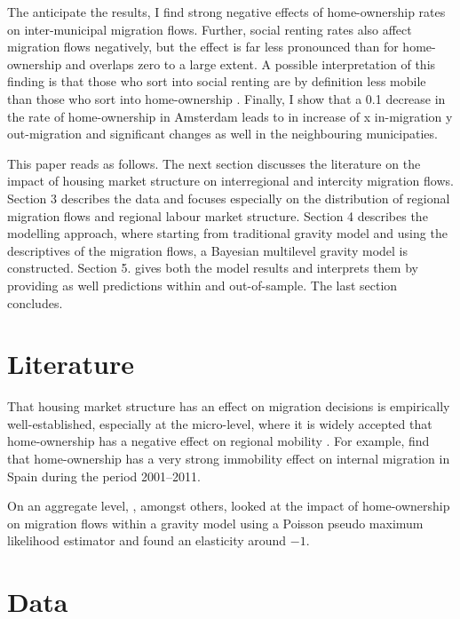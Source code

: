 \documentclass[fleqn,10pt]{SelfArx} %
\begin{document}
		The anticipate the results, I find strong negative effects of home-ownership rates on inter-municipal migration flows. Further, social renting rates also affect migration flows negatively, but the effect is far less pronounced than for home-ownership and overlaps zero to a large extent. A possible interpretation of this finding is that those who sort into social renting are by definition less mobile than those who sort into home-ownership \citep[this argument is put forward by][as well]{boyle1998migration}. Finally, I show that a 0.1 decrease in the rate of home-ownership in Amsterdam leads to in increase of x in-migration y out-migration and significant changes as well in the neighbouring municipaties. 

        This paper reads as follows. The next section discusses the literature on the impact of housing market structure on interregional and intercity migration flows. Section 3 describes the
        data and focuses especially on the distribution of regional
        migration flows and regional labour market structure. Section
        4 describes the modelling approach, where starting from
        traditional gravity model and using the descriptives of the
        migration flows, a Bayesian multilevel gravity model is constructed. Section
        5. gives both the model results and interprets them by providing as well predictions within and
        out-of-sample. The last section concludes.

		\section{Literature}

		That housing market structure has an effect on migration
		decisions is empirically well-established, especially at the micro-level,
		where it is widely accepted that home-ownership has a negative
		effect on regional mobility \citep{dietz2003social}. For
		example, \citet{palomares2018understanding} find that
		home-ownership has a very strong immobility effect on
		internal migration in Spain during the period 2001--2011.
		
		On an aggregate level, \citet{amirault2016drags}, amongst others,
		looked at the impact of home-ownership on migration flows
		within a gravity model using a Poisson pseudo maximum
		likelihood estimator and found an elasticity around
		$-1$. 

        \section{Data}
\end{document}
